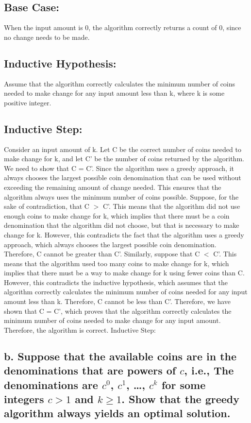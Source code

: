 \documentclass[fleqn,10pt]{olplainarticle}
\begin{document}
\subsection*{Base Case:  }
When the input amount is 0, the algorithm correctly returns a count of 0, since no change needs to be made.

\subsection*{Inductive Hypothesis: }
Assume that the algorithm correctly calculates the minimum number of coins needed to make change for any input amount less than k, where k is some positive integer.

\subsection*{Inductive Step: }
Consider an input amount of k. Let C be the correct number of coins needed to make change for k, and let C' be the number of coins returned by the algorithm. We need to show that C = C'.
Since the algorithm uses a greedy approach, it always chooses the largest possible coin denomination that can be used without exceeding the remaining amount of change needed. This ensures that the algorithm always uses the minimum number of coins possible.
Suppose, for the sake of contradiction, that C $>$ C'. This means that the algorithm did not use enough coins to make change for k, which implies that there must be a coin denomination that the algorithm did not choose, but that is necessary to make change for k. However, this contradicts the fact that the algorithm uses a greedy approach, which always chooses the largest possible coin denomination. Therefore, C cannot be greater than C'.
Similarly, suppose that C $<$ C'. This means that the algorithm used too many coins to make change for k, which implies that there must be a way to make change for k using fewer coins than C. However, this contradicts the inductive hypothesis, which assumes that the algorithm correctly calculates the minimum number of coins needed for any input amount less than k. Therefore, C cannot be less than C'.
\newline Therefore, we have shown that C = C', which proves that the algorithm correctly calculates the minimum number of coins needed to make change for any input amount. Therefore, the algorithm is correct.
Inductive Step: 

\subsection*{b. Suppose that the available coins are in the denominations that are powers of $c$, i.e., The denominations are $c^0$, $c^1$, …, $c^k$ for some integers $c > 1$ and $k \geq 1$. Show that the greedy algorithm always yields an optimal solution.\newline\newline}
\end{document}
